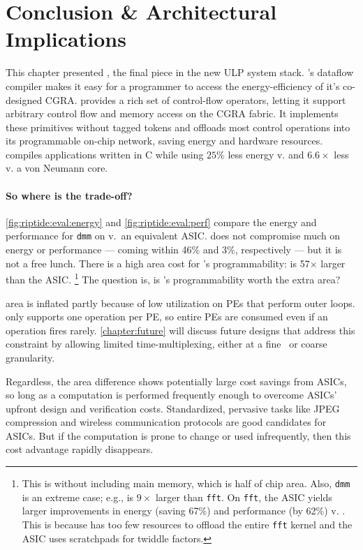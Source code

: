 \section{Conclusion \& Architectural Implications}
\label{riptide:implications}
This chapter presented \riptide, the final piece in the new ULP system stack.
% 
\riptide's dataflow compiler makes it easy for a programmer to access the energy-efficiency of it's co-designed CGRA.
% 
\riptide provides a rich set of control-flow operators, letting it support arbitrary control flow and memory access on the CGRA fabric. 
% 
It implements these primitives without tagged tokens and offloads most control operations into its programmable on-chip network, saving energy and hardware resources.
% 
\riptide compiles applications written in C while using $25\%$ less energy v. \snafu and $6.6\times$ less v. a von Neumann core.

\paragraph[]{So where is the trade-off?}
\autoref{fig:riptide:eval:energy} and \autoref{fig:riptide:eval:perf} compare the energy and performance for {\tt dmm} on \riptide v.\ an equivalent ASIC.
%
\riptide does not compromise much on energy or performance --- coming within 46\% and 3\%, respectively --- but it is not a free lunch.
%
There is a high area cost for \riptide's programmability: \riptide is 57$\times$ larger than the ASIC.%
\footnote{This is without including main memory, which is half of chip area. Also, {\tt dmm} is an extreme case; e.g., \riptide is $9\times$ larger than {\tt fft}. On {\tt fft}, the ASIC yields larger improvements in energy (saving 67\%) and performance (by 62\%) v. \riptide. This is because \riptide has too few resources to offload the entire {\tt fft} kernel and the ASIC uses scratchpads for twiddle factors.}
%
The question is, is \riptide's programmability worth the extra area?

\riptide area is inflated partly because of low utilization on PEs that perform outer loops.
%
\riptide only supports one operation per PE, so entire PEs are consumed even if an operation fires rarely.
%
\autoref{chapter:future} will discuss future designs that address this constraint by
allowing limited time-multiplexing,
either at a fine~\cite{weng2020hybrid} or coarse~\cite{nguyen2021fifer} granularity.

Regardless, the area difference shows potentially large cost savings from ASICs,
so long as a computation is performed frequently enough to overcome
ASICs' upfront design and verification costs.
%
Standardized, pervasive tasks like JPEG compression and wireless communication protocols are good candidates for ASICs.
%
But if the computation is prone to change
or used infrequently, then this cost advantage rapidly disappears.

